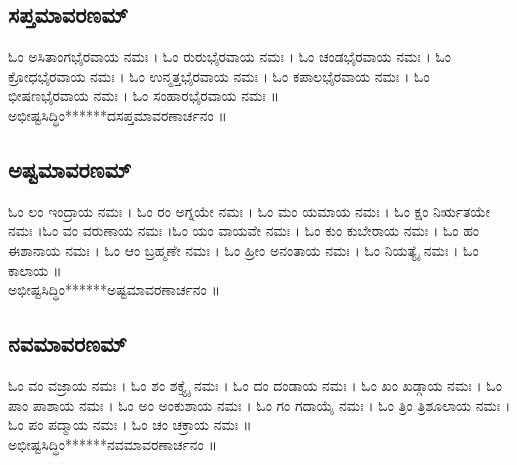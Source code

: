 \subsection{ಸಪ್ತಮಾವರಣಮ್}
ಓಂ ಅಸಿತಾಂಗಭೈರವಾಯ ನಮಃ । ಓಂ ರುರುಭೈರವಾಯ ನಮಃ । ಓಂ ಚಂಡಭೈರವಾಯ ನಮಃ । ಓಂ ಕ್ರೋಧಭೈರವಾಯ ನಮಃ । ಓಂ ಉನ್ಮತ್ತಭೈರವಾಯ ನಮಃ । ಓಂ ಕಪಾಲಭೈರವಾಯ ನಮಃ । ಓಂ ಭೀಷಣಭೈರವಾಯ ನಮಃ । ಓಂ ಸಂಹಾರಭೈರವಾಯ ನಮಃ ॥\\%
ಅಭೀಷ್ಟಸಿದ್ಧಿಂ******ದಸಪ್ತಮಾವರಣಾರ್ಚನಂ ॥
\subsection{ಅಷ್ಟಮಾವರಣಮ್}
ಓಂ ಲಂ ಇಂದ್ರಾಯ ನಮಃ । ಓಂ ರಂ ಅಗ್ನಯೇ ನಮಃ । ಓಂ ಮಂ ಯಮಾಯ ನಮಃ । ಓಂ ಕ್ಷಂ ನಿರ್ಋತಯೇ ನಮಃ ।ಓಂ ವಂ ವರುಣಾಯ ನಮಃ ।ಓಂ ಯಂ ವಾಯವೇ ನಮಃ । ಓಂ ಕುಂ ಕುಬೇರಾಯ ನಮಃ । ಓಂ ಹಂ ಈಶಾನಾಯ ನಮಃ । ಓಂ ಆಂ ಬ್ರಹ್ಮಣೇ ನಮಃ । ಓಂ ಹ್ರೀಂ ಅನಂತಾಯ ನಮಃ । ಓಂ ನಿಯತ್ಯೈ ನಮಃ । ಓಂ ಕಾಲಾಯ ॥\\
ಅಭೀಷ್ಟಸಿದ್ಧಿಂ******ಅಷ್ಟಮಾವರಣಾರ್ಚನಂ ॥
\subsection{ನವಮಾವರಣಮ್}
ಓಂ ವಂ ವಜ್ರಾಯ ನಮಃ । ಓಂ ಶಂ ಶಕ್ತ್ಯೈ ನಮಃ । ಓಂ ದಂ ದಂಡಾಯ ನಮಃ । ಓಂ ಖಂ ಖಡ್ಗಾಯ ನಮಃ । ಓಂ ಪಾಂ ಪಾಶಾಯ ನಮಃ । ಓಂ ಅಂ ಅಂಕುಶಾಯ ನಮಃ । ಓಂ ಗಂ ಗದಾಯೈ ನಮಃ । ಓಂ ತ್ರಿಂ ತ್ರಿಶೂಲಾಯ ನಮಃ । ಓಂ ಪಂ ಪದ್ಮಾಯ ನಮಃ । ಓಂ ಚಂ ಚಕ್ರಾಯ ನಮಃ ॥\\
ಅಭೀಷ್ಟಸಿದ್ಧಿಂ******ನವಮಾವರಣಾರ್ಚನಂ ॥
